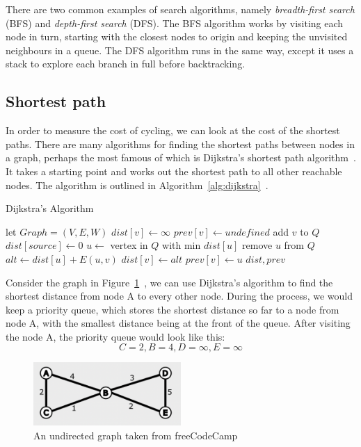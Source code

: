 \documentclass[12pt,a4paper]{report}
\begin{document}
There are two common examples of search algorithms, namely \textit{breadth-first search} (BFS) and \textit{depth-first search} (DFS). The BFS algorithm works by visiting each node in turn, starting with the closest nodes to origin and keeping the unvisited neighbours in a queue. The DFS algorithm runs in the same way, except it uses a stack to explore each branch in full before backtracking.

\subsection{Shortest path}
In order to measure the cost of cycling, we can look at the cost of the shortest paths. There are many algorithms for finding the shortest paths between nodes in a graph, perhaps the most famous of which is Dijkstra's shortest path algorithm~\cite{dijkstra1959note}. It takes a starting point and works out the shortest path to all other reachable nodes. The algorithm is outlined in Algorithm~\ref{alg:dijkstra}~\cite{WikipediaEN:dijkstra}.

\begin{algorithm}
\caption{Dijkstra's Algorithm}\label{alg:dijkstra}
\begin{algorithmic}
    \State let $Graph = (V, E, W)$
        \State $dist[v]\gets \infty$
        \State $prev[v]\gets undefined$
        \State add $v$ to $Q$
    \EndFor
    \State $dist[source]\gets 0$
        \State $u\gets$ vertex in $Q$ with min $dist[u]$
        \State remove $u$ from $Q$
            \State $alt \gets dist[u] + E(u, v)$
                \State $dist[v]\gets alt$
                \State $prev[v]\gets u$
            \EndIf
        \EndFor
    \EndWhile
    \State \Return $dist, prev$
\EndFunction
\end{algorithmic}
\end{algorithm}

Consider the graph in Figure~\ref{fig:dijkstra_example}~\cite{abba2022}, we can use Dijkstra's algorithm to find the shortest distance from node A to every other node. During the process, we would keep a priority queue, which stores the shortest distance so far to a node from node A, with the smallest distance being at the front of the queue. After visiting the node A, the priority queue would look like this:
\[C=2, B=4, D=\infty, E=\infty\]

\begin{figure}[ht]
\centering
\includegraphics[width=0.5\textwidth]{diss_images/context/dijkstra.png}
\caption{An undirected graph taken from freeCodeCamp~\cite{abba2022}}
\label{fig:dijkstra_example}
\end{figure}
\end{document}
